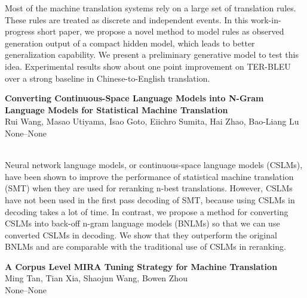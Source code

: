 \documentclass[twoside,makeidx]{book}
\begin{document}
\nopagebreak%
\noindent%
{\small Most of the machine translation systems rely on a large set of translation rules. These rules are treated as discrete and independent events. In this work-in-progress short paper, we propose a novel method to model rules as observed generation output of a compact hidden model, which leads to better generalization capability. We present a preliminary generative model to test this idea. Experimental results show about one point improvement on TER-BLEU over a strong baseline in Chinese-to-English translation.}
\par\vspace{2em}\noindent%
\begin{minipage}{\linewidth}%
\begin{center}
\textbf{\normalsize Converting Continuous-Space Language Models into N-Gram Language Models for Statistical Machine Translation}\\
\normalsize  Rui Wang,  Masao Utiyama,  Isao Goto,  Eiichro Sumita,  Hai Zhao,  Bao-Liang Lu\\
{\small None--None}\\
\end{center}
\end{minipage}\\[0.5em]
\nopagebreak%
\noindent%
{\small Neural network language models, or continuous-space language models (CSLMs), have been shown to improve the performance of statistical machine translation (SMT) when they are used for reranking n-best translations. However, CSLMs have not been used in the first pass decoding of SMT, because using CSLMs in decoding takes a lot of time. In contrast, we propose a method for converting CSLMs into back-off n-gram language models (BNLMs) so that we can use converted CSLMs in decoding. We show that they outperform the original BNLMs and are comparable with the traditional use of CSLMs in reranking.}
\par\vspace{2em}\noindent%
\begin{minipage}{\linewidth}%
\begin{center}
\textbf{\normalsize A Corpus Level MIRA Tuning Strategy for Machine Translation}\\
\normalsize  Ming Tan,  Tian Xia,  Shaojun Wang,  Bowen Zhou\\
{\small None--None}\\
\end{center}
\end{minipage}\\[0.5em]
\end{document}
